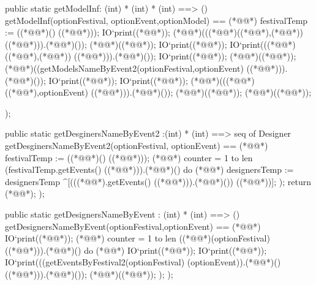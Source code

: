 \begin{vdmpp}[breaklines=true]
  
  public static getModelInf: (int) * (int) * (int) ==> ()
  getModelInf(optionFestival, optionEvent,optionModel) ==
  (*@\vdmnotcovered{(}@*) 
  festivalTemp := ((*@@*)() ((*@@*)));
  IO`print((*@@*));
   (*@@*)(((*@@*)((*@@*),(*@@*)) ((*@@*))).(*@@*)());
   (*@@*)((*@@*));
   IO`print((*@@*));
   IO`print(((*@@*)((*@@*),(*@@*)) ((*@@*))).(*@@*)());
   IO`print((*@@*));
   (*@@*)((*@@*));
   (*@@*)((getModelsNameByEvent2(optionFestival,optionEvent) ((*@@*))).(*@@*)());
   IO`print((*@@*));
   IO`print((*@@*));
   (*@@*)(((*@@*)((*@@*),optionEvent) ((*@@*))).(*@@*)());
   (*@@*)((*@@*));
   (*@@*)((*@@*));
    
  );
 
 public static getDesginersNameByEvent2 :(int) * (int) ==> seq of Designer
  getDesginersNameByEvent2(optionFestival, optionEvent) == (*@\vdmnotcovered{(}@*)
  festivalTemp := ((*@@*)() ((*@@*)));
    (*@@*) counter = 1 to len (festivalTemp.getEvents() ((*@@*))).(*@@*)() do (*@\vdmnotcovered{(}@*)
    designersTemp := designersTemp ^[(((*@@*).getEvents() ((*@@*))).(*@@*)()) ((*@@*))];
   );
   return (*@@*);
  );
 
 public static getDesignersNameByEvent : (int) * (int) ==> ()
  getDesignersNameByEvent(optionFestival,optionEvent) == (*@\vdmnotcovered{(}@*)
      IO`print((*@@*));
    (*@@*) counter = 1 to len ((*@@*)(optionFestival) ((*@@*))).(*@@*)() do (*@\vdmnotcovered{(}@*)
    IO`print((*@@*));
    IO`print((*@@*));
    IO`print(((getEventsByFestival2(optionFestival) (optionEvent)).(*@@*)() ((*@@*))).(*@@*)());
    (*@@*)((*@@*));
  );
  );
  

\end{vdmpp}

